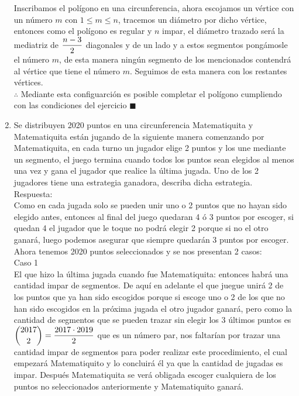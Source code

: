 \documentclass{book}
\begin{document}
\begin{enumerate}
          Inscribamos el polígono en una circunferencia, ahora escojamos un vértice con un número $m$ con $1\leq m\leq n$, tracemos un diámetro por dicho vértice, entonces como el polígono es regular y $n$ impar, el diámetro trazado será la mediatriz de $\displaystyle{{n-3 \over 2}}$ diagonales y de un lado y a estos segmentos pongámosle el número $m$, de esta manera ningún segmento de los mencionados contendrá al vértice que tiene el número $m$. Seguimos de esta manera con los restantes vértices.\\
          $\therefore$ Mediante esta configuarción es posible completar el polígono cumpliendo con las condiciones del ejercicio $\blacksquare$\\
    \item Se distribuyen 2020 puntos en una circunferencia Matematiquita y Matematiquita están jugando de la siguiente manera comenzando por Matematiquita, en cada turno un jugador elige 2 puntos y los une mediante un segmento, el juego termina cuando todos los puntos sean elegidos al menos una vez y gana el jugador que realice la última jugada. Uno de los 2 jugadores tiene una estrategia ganadora, describa dicha estrategia.\\
          Respuesta:\\
          Como en cada jugada solo se pueden unir uno o 2 puntos que no hayan sido elegido antes, entonces al final del juego quedaran 4 ó 3 puntos por escoger, si quedan 4 el jugador que le toque no podrá elegir 2 porque si no el otro ganará, luego podemos asegurar que siempre quedarán 3 puntos por escoger. Ahora tenemos 2020 puntos seleccionados y se nos presentan 2 casos:\\
          Caso 1\\
          El que hizo la última jugada cuando fue Matematiquita: entonces habrá una cantidad impar de segmentos. De aquí en adelante el que juegue unirá 2 de los puntos que ya han sido escogidos porque si escoge uno o 2 de los que no han sido escogidos en la próxima jugada el otro jugador ganará, pero como la cantidad de segmentos que se pueden trazar sin elegir los 3 últimos puntos es $\displaystyle{{2017 \choose 2}={2017\cdot 2019\over 2}}$ que es un número par, nos faltarían por trazar una cantidad impar de segmentos para poder realizar este procedimiento, el cual empezará Matematiquito y lo concluirá él ya que la cantidad de jugadas es impar. Después Matematiquita se verá obligada escoger cualquiera de los puntos no seleccionados anteriormente y Matematiquito ganará.\\

\end{enumerate}
\end{document}
